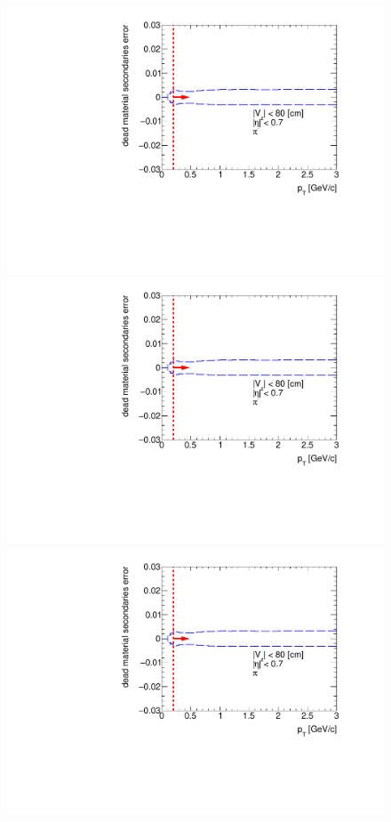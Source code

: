 \begin{figure}[hb]
\centering
\parbox{0.49\textwidth}{
  \centering
  \includegraphics[width=\linewidth,page=1]{graphics/systematicsEfficiency/deadMaterial/secondaries_Unbinned_SDCD_1D.pdf}\\
  \includegraphics[width=\linewidth,page=2]{graphics/systematicsEfficiency/deadMaterial/secondaries_Unbinned_SDCD_1D.pdf}\\
  \includegraphics[width=\linewidth,page=3]{graphics/systematicsEfficiency/deadMaterial/secondaries_Unbinned_SDCD_1D.pdf}\\
}
\end{figure}
